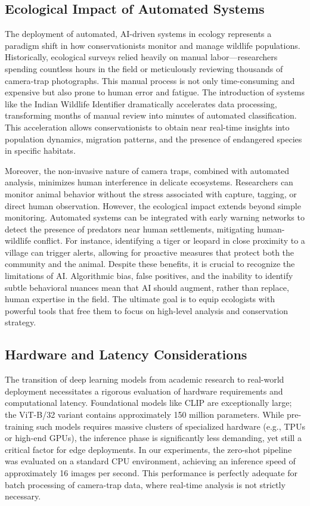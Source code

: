 \documentclass[11pt]{article}
\begin{document}
\subsection{Ecological Impact of Automated Systems}
The deployment of automated, AI-driven systems in ecology represents a paradigm shift in how conservationists monitor and manage wildlife populations. Historically, ecological surveys relied heavily on manual labor—researchers spending countless hours in the field or meticulously reviewing thousands of camera-trap photographs. This manual process is not only time-consuming and expensive but also prone to human error and fatigue. The introduction of systems like the Indian Wildlife Identifier dramatically accelerates data processing, transforming months of manual review into minutes of automated classification. This acceleration allows conservationists to obtain near real-time insights into population dynamics, migration patterns, and the presence of endangered species in specific habitats.

Moreover, the non-invasive nature of camera traps, combined with automated analysis, minimizes human interference in delicate ecosystems. Researchers can monitor animal behavior without the stress associated with capture, tagging, or direct human observation. However, the ecological impact extends beyond simple monitoring. Automated systems can be integrated with early warning networks to detect the presence of predators near human settlements, mitigating human-wildlife conflict. For instance, identifying a tiger or leopard in close proximity to a village can trigger alerts, allowing for proactive measures that protect both the community and the animal. Despite these benefits, it is crucial to recognize the limitations of AI. Algorithmic bias, false positives, and the inability to identify subtle behavioral nuances mean that AI should augment, rather than replace, human expertise in the field. The ultimate goal is to equip ecologists with powerful tools that free them to focus on high-level analysis and conservation strategy.

\subsection{Hardware and Latency Considerations}
The transition of deep learning models from academic research to real-world deployment necessitates a rigorous evaluation of hardware requirements and computational latency. Foundational models like CLIP are exceptionally large; the ViT-B/32 variant contains approximately 150 million parameters. While pre-training such models requires massive clusters of specialized hardware (e.g., TPUs or high-end GPUs), the inference phase is significantly less demanding, yet still a critical factor for edge deployments. In our experiments, the zero-shot pipeline was evaluated on a standard CPU environment, achieving an inference speed of approximately 16 images per second. This performance is perfectly adequate for batch processing of camera-trap data, where real-time analysis is not strictly necessary.
\end{document}
